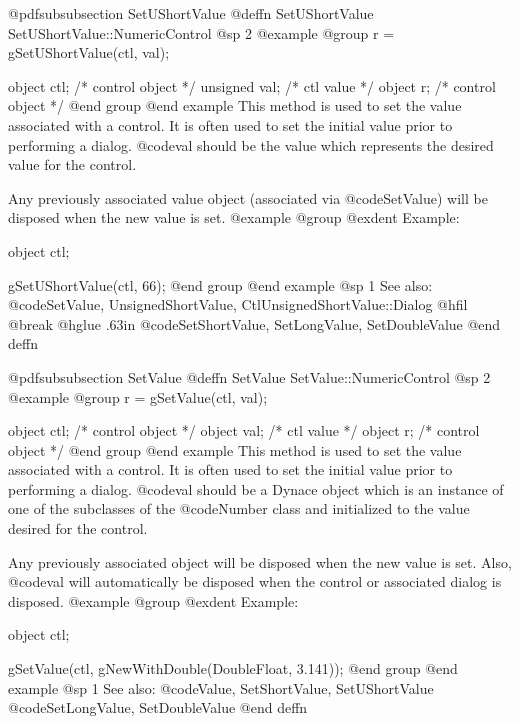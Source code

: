 @pdfsubsubsection {SetUShortValue}
@deffn {SetUShortValue} SetUShortValue::NumericControl
@sp 2
@example
@group
r = gSetUShortValue(ctl, val);

object    ctl;  /*  control object  */
unsigned  val;  /*  ctl value       */
object    r;    /*  control object  */
@end group
@end example
This method is used to set the value associated with a control.  It is
often used to set the initial value prior to performing a dialog.
@code{val} should be the value which represents the desired value for
the control.

Any previously associated value object (associated via @code{SetValue})
will be disposed when the new value is set.
@example
@group
@exdent Example:

object  ctl;

gSetUShortValue(ctl, 66);
@end group
@end example
@sp 1
See also:  @code{SetValue, UnsignedShortValue, CtlUnsignedShortValue::Dialog}
@hfil @break @hglue .63in @code{SetShortValue, SetLongValue, SetDoubleValue}
@end deffn
















@pdfsubsubsection {SetValue}
@deffn {SetValue} SetValue::NumericControl
@sp 2
@example
@group
r = gSetValue(ctl, val);

object  ctl;    /*  control object  */
object  val;    /*  ctl value       */
object  r;      /*  control object  */
@end group
@end example
This method is used to set the value associated with a control.  It is
often used to set the initial value prior to performing a dialog.
@code{val} should be a Dynace object which is an instance of one of the
subclasses of the @code{Number} class and initialized to the value
desired for the control.

Any previously associated object will be disposed when the new value is set.
Also, @code{val} will automatically be disposed when the control or associated
dialog is disposed.
@example
@group
@exdent Example:

object  ctl;

gSetValue(ctl, gNewWithDouble(DoubleFloat, 3.141));
@end group
@end example
@sp 1
See also:  @code{Value, SetShortValue, SetUShortValue}
        @code{SetLongValue, SetDoubleValue}
@end deffn












